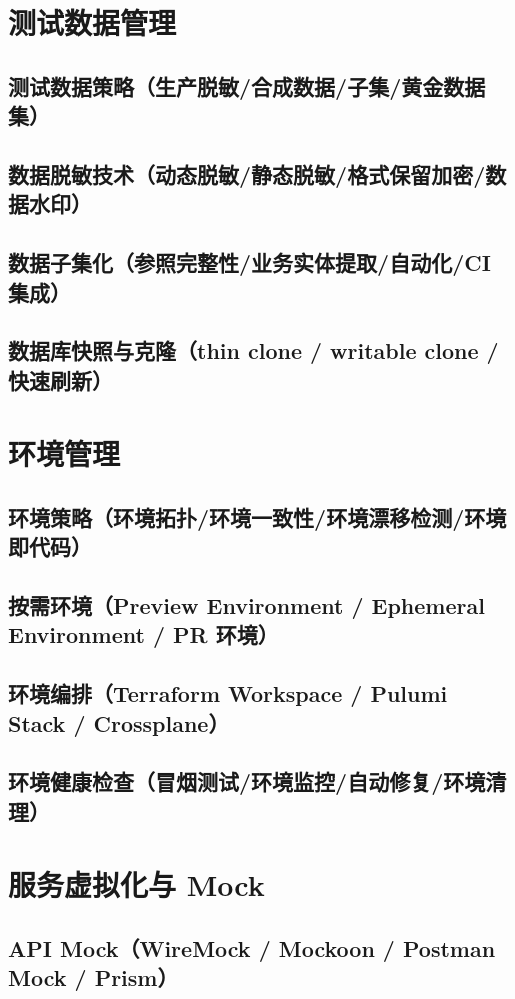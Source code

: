\documentclass[12pt,UTF8]{ctexbook}
\begin{document}
  \section{测试数据管理}
    \subsection{测试数据策略（生产脱敏/合成数据/子集/黄金数据集）}
    \subsection{数据脱敏技术（动态脱敏/静态脱敏/格式保留加密/数据水印）}
    \subsection{数据子集化（参照完整性/业务实体提取/自动化/CI 集成）}
    \subsection{数据库快照与克隆（thin clone / writable clone / 快速刷新）}

  \section{环境管理}
    \subsection{环境策略（环境拓扑/环境一致性/环境漂移检测/环境即代码）}
    \subsection{按需环境（Preview Environment / Ephemeral Environment / PR 环境）}
    \subsection{环境编排（Terraform Workspace / Pulumi Stack / Crossplane）}
    \subsection{环境健康检查（冒烟测试/环境监控/自动修复/环境清理）}

  \section{服务虚拟化与 Mock}
    \subsection{API Mock（WireMock / Mockoon / Postman Mock / Prism）}
\end{document}
